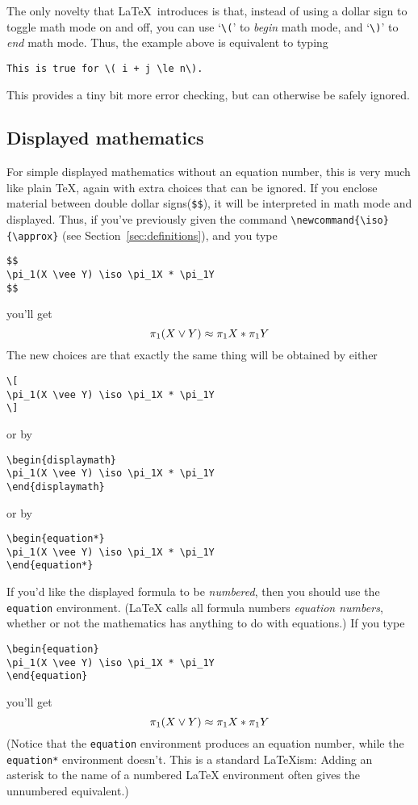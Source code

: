 The only novelty that \LaTeX\ introduces is that, instead of using
a dollar sign  to toggle math mode on and off, you can use
`\verb"\("' to {\em begin\/} math mode, and `\verb"\)"' to {\em end\/}
math mode.  Thus, the example above is equivalent to typing
\begin{center}
\verb"This is true for \( i + j \le n\)."
\end{center}
This provides a tiny bit more error checking, but can
otherwise be safely ignored.


\subsection{Displayed mathematics}

For simple displayed mathematics without an equation number, this is
very much like plain \TeX, again with extra choices that can be
ignored.  If you enclose material between double dollar
signs(\verb"$$"), it will be interpreted in math mode and displayed.
Thus, if you've previously given the command
\verb"\newcommand{\iso}{\approx}" (see
Section~\ref{sec:definitions}),
and you type
%
\begin{verbatim}
$$
\pi_1(X \vee Y) \iso \pi_1X * \pi_1Y
$$
\end{verbatim}
%
you'll get
%
$$
\pi_1(X \vee Y) \iso \pi_1X * \pi_1Y
$$
%
The new choices are that exactly the same thing will be obtained by
either
%
\begin{verbatim}
\[
\pi_1(X \vee Y) \iso \pi_1X * \pi_1Y
\]
\end{verbatim}
%
or by
%
\begin{verbatim}
\begin{displaymath}
\pi_1(X \vee Y) \iso \pi_1X * \pi_1Y
\end{displaymath}
\end{verbatim}
%
or by
%
\begin{verbatim}
\begin{equation*}
\pi_1(X \vee Y) \iso \pi_1X * \pi_1Y
\end{equation*}
\end{verbatim}


If you'd like the displayed formula to be {\em numbered}, then you
should use the \verb"equation" environment.  (\LaTeX{} calls all
formula numbers {\em equation numbers}, whether or not the
mathematics has anything to do with equations.)  If you type
%
\begin{verbatim}
\begin{equation}
\pi_1(X \vee Y) \iso \pi_1X * \pi_1Y
\end{equation}
\end{verbatim}
%
you'll get
%
\begin{equation}
\label{pi1eqn}
\pi_1(X \vee Y) \iso \pi_1X * \pi_1Y
\end{equation}
%
(Notice that the \verb"equation" environment produces an equation
number, while the \verb"equation*" environment doesn't.  This is a
standard \LaTeX ism: Adding an asterisk to the name of a numbered
\LaTeX{} environment often gives the unnumbered equivalent.)


